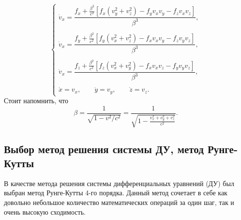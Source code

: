 \begin{equation}
\begin{cases}
\dot{v}_x = \dfrac{f_x  + \frac{\beta^2}{c^2} \left[ f_x \left(v_y^2 + v_z^2\right) - f_y v_x v_y  - f_z v_x v_z  \right] }{\beta^3 }, \\ \\

\dot{v}_x = \dfrac{f_y  + \frac{\beta^2}{c^2} \left[ f_y \left(v_x^2 + v_z^2\right) - f_x v_x v_y  - f_z v_y v_z  \right] }{\beta^3}, \\ \\

\dot{v}_x = \dfrac{f_z  + \frac{\beta^2}{c^2} \left[ f_z \left(v_x^2 + v_y^2\right) - f_x v_x v_z  - f_y v_y v_z  \right] }{\beta^3}, \\ \\

\dot{x} = v_x, \qquad \dot{y} = v_y, \qquad \dot{z} = v_z.
\end{cases}
\label{eq:style2}
\end{equation}
Стоит напомнить, что
\begin{equation*}
\beta = \frac{1}{\sqrt{1 - v^2/c^2}} = \frac{1}{\sqrt{1 - \frac{v_x^2 + v_y^2 + v_z^2}{c^2}}}.
\end{equation*}

\subsection{Выбор метод решения системы ДУ, метод Рунге-Кутты}

В качестве метода решения системы дифференциальных уравнений (ДУ) был выбран метод Рунге-Кутты 4-го порядка. Данный метод сочетает в себе как довольно небольшое количество математических операций за один шаг, так и очень высокую сходимость\cite{butcher1987numerical}.

